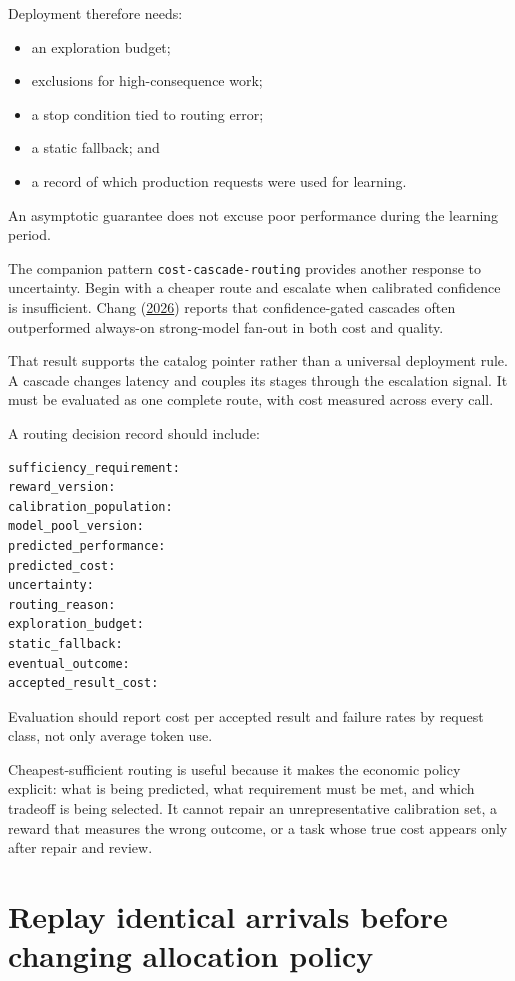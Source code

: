 Deployment therefore needs:

\begin{itemize}
\tightlist
\item
  an exploration budget;
\item
  exclusions for high-consequence work;
\item
  a stop condition tied to routing error;
\item
  a static fallback; and
\item
  a record of which production requests were used for learning.
\end{itemize}

An asymptotic guarantee does not excuse poor performance during the learning period.

The companion pattern \texttt{cost-cascade-routing} provides another response to uncertainty. Begin with a cheaper route and escalate when calibrated confidence is insufficient. Chang (\href{https://arxiv.org/abs/2604.12262}{2026}) reports that confidence-gated cascades often outperformed always-on strong-model fan-out in both cost and quality.

That result supports the catalog pointer rather than a universal deployment rule. A cascade changes latency and couples its stages through the escalation signal. It must be evaluated as one complete route, with cost measured across every call.

A routing decision record should include:

\begin{verbatim}
sufficiency_requirement:
reward_version:
calibration_population:
model_pool_version:
predicted_performance:
predicted_cost:
uncertainty:
routing_reason:
exploration_budget:
static_fallback:
eventual_outcome:
accepted_result_cost:
\end{verbatim}

Evaluation should report cost per accepted result and failure rates by request class, not only average token use.

Cheapest-sufficient routing is useful because it makes the economic policy explicit: what is being predicted, what requirement must be met, and which tradeoff is being selected. It cannot repair an unrepresentative calibration set, a reward that measures the wrong outcome, or a task whose true cost appears only after repair and review.

\section{Replay identical arrivals before changing allocation policy}\label{replay-identical-arrivals-before-changing-allocation-policy}

